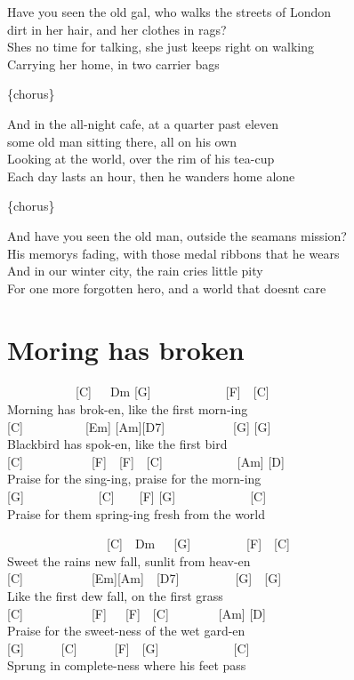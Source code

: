 \documentclass[
  letterpaper,
  a5paper]{memoir}
\begin{document}
Have you seen the old gal, who walks the streets of London\\
dirt in her hair, and her clothes in rags?\\
She\textquotesingle s no time for talking, she just keeps right on
walking\\
Carrying her home, in two carrier bags

\{chorus\}

And in the all-night cafe, at a quarter past eleven\\
some old man sitting there, all on his own\\
Looking at the world, over the rim of his tea-cup\\
Each day lasts an hour, then he wanders home alone

\{chorus\}

And have you seen the old man, outside the seaman\textquotesingle s
mission?\\
His memory\textquotesingle s fading, with those medal ribbons that he
wears\\
And in our winter city, the rain cries little pity\\
For one more forgotten hero, and a world that doesn\textquotesingle t
care

\hypertarget{moring-has-broken}{%
\chapter{Moring has broken}\label{moring-has-broken}}

~~~~~~~~~~~{[}C{]}~~~Dm {[}G{]}~~~~~~~~~~~~{[}F{]}~~{[}C{]}\\
Morning has brok-en, like the first morn-ing\\
{[}C{]}~~~~~~~~~~{[}Em{]} {[}Am{]}{[}D7{]}~~~~~~~~~~~{[}G{]} {[}G{]}\\
Blackbird has spok-en, like the first bird\\
{[}C{]}~~~~~~~~~~~{[}F{]}~~{[}F{]}~~{[}C{]}~~~~~~~~~~~~{[}Am{]}
{[}D{]}\\
Praise for the sing-ing, praise for the morn-ing\\
{[}G{]}~~~~~~~~~~~~{[}C{]}~~~~{[}F{]} {[}G{]}~~~~~~~~~~~~{[}C{]}\\
Praise for them spring-ing fresh from the world

~~~~~~~~~~~~~~~~{[}C{]}~~Dm~~~{[}G{]}~~~~~~~~~{[}F{]}~~{[}C{]}\\
Sweet the rain\textquotesingle s new fall, sunlit from heav-en\\
{[}C{]}~~~~~~~~~~~{[}Em{]}{[}Am{]}~~{[}D7{]}~~~~~~~~~{[}G{]}~~{[}G{]}\\
Like the first dew fall, on the first grass\\
{[}C{]}~~~~~~~~~~~{[}F{]}~~~{[}F{]}~~{[}C{]}~~~~~~~~{[}Am{]} {[}D{]}\\
Praise for the sweet-ness of the wet gard-en\\
{[}G{]}~~~~~~{[}C{]}~~~~~~{[}F{]}~~{[}G{]}~~~~~~~~~~~~{[}C{]}\\
Sprung in complete-ness where his feet pass
\end{document}

